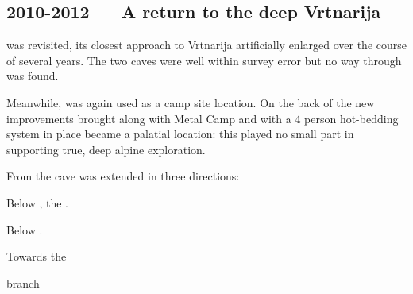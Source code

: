 \subsection{2010-2012 --- A return to the deep Vrtnarija} 
 was revisited, its closest approach to Vrtnarija artificially enlarged over the course of several years. The two caves were well within survey error but no way through was found. 

Meanwhile,  was again used as a camp site location. On the back of the new improvements brought along with Metal Camp and with a 4 person hot-bedding system in place  became a palatial location: this played no small part in supporting true, deep alpine exploration.

From  the cave was extended in three directions:
\begin{citemize}
\item Below , the .
\item Below .
\item Towards the 
\end{citemize} branch 
    
